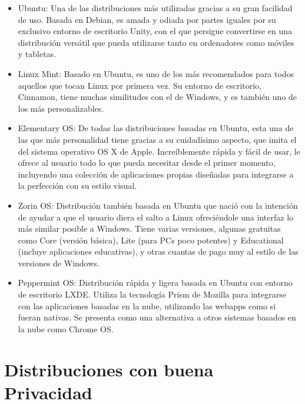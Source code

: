 \documentclass[11pt, a4paper]{report}
\begin{document}
\begin{itemize}
\item Ubuntu: Una de las distribuciones más utilizadas gracias a su gran
  facilidad de uso. Basada en Debian, es amada y odiada por partes iguales por
  su exclusivo entorno de escritorio Unity, con el que persigue convertirse en
  una distribución versátil que pueda utilizarse tanto en ordenadores como
  móviles y tabletas.
\item Linux Mint: Basado en Ubuntu, es uno de los más recomendados para todos
  aquellos que tocan Linux por primera vez. Su entorno de escritorio, Cinnamon,
  tiene muchas similitudes con el de Windows, y es también uno de los más
  personalizables.
\item Elementary OS: De todas las distribuciones basadas en Ubuntu, esta una de
  las que más personalidad tiene gracias a su cuidadísimo aspecto, que imita el
  del sistema operativo OS X de Apple. Increíblemente rápida y fácil de usar,
  le ofrece al usuario todo lo que pueda necesitar desde el primer momento,
  incluyendo una colección de aplicaciones propias diseñadas para integrarse a
  la perfección con su estilo visual.
\item Zorin OS: Distribución también basada en Ubuntu que nació con la
  intención de ayudar a que el usuario diera el salto a Linux ofreciéndole una
  interfaz lo más similar posible a Windows. Tiene varias versiones, algunas
  gratuitas como Core (versión básica), Lite (para PCs poco potentes) y
  Educational (incluye aplicaciones educativas), y otras cuantas de pago muy al
  estilo de las versiones de Windows.
\item Peppermint OS: Distribución rápida y ligera basada en Ubuntu con entorno
  de escritorio LXDE. Utiliza la tecnología Prism de Mozilla para integrarse
  con las aplicaciones basadas en la nube, utilizando las webapps como si
  fueran nativas. Se presenta como una alternativa a otros sistemas basados en
  la nube como Chrome OS.
\end{itemize}

\section*{Distribuciones con buena Privacidad}
\end{document}
